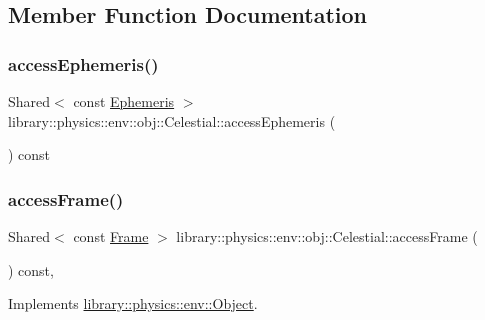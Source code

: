 \subsection{Member Function Documentation}
\mbox{\label{classlibrary_1_1physics_1_1env_1_1obj_1_1_celestial_ab56fff3f2f1508dee79fa7410d67e300}} 
\subsubsection{\texorpdfstring{access\+Ephemeris()}{accessEphemeris()}}
{\footnotesize\ttfamily Shared$<$ const \hyperlink{classlibrary_1_1physics_1_1env_1_1_ephemeris}{Ephemeris} $>$ library\+::physics\+::env\+::obj\+::\+Celestial\+::access\+Ephemeris (\begin{DoxyParamCaption}{ }\end{DoxyParamCaption}) const}

\mbox{\label{classlibrary_1_1physics_1_1env_1_1obj_1_1_celestial_a6649bfe0bf0795aa4def046a8c38aef5}} 
\subsubsection{\texorpdfstring{access\+Frame()}{accessFrame()}}
{\footnotesize\ttfamily Shared$<$ const \hyperlink{classlibrary_1_1physics_1_1coord_1_1_frame}{Frame} $>$ library\+::physics\+::env\+::obj\+::\+Celestial\+::access\+Frame (\begin{DoxyParamCaption}{ }\end{DoxyParamCaption}) const\hspace{0.3cm}{\ttfamily [override]}, {\ttfamily [virtual]}}



Implements \hyperlink{classlibrary_1_1physics_1_1env_1_1_object_a6ff59bc7375388118c60b5823dad748b}{library\+::physics\+::env\+::\+Object}.

